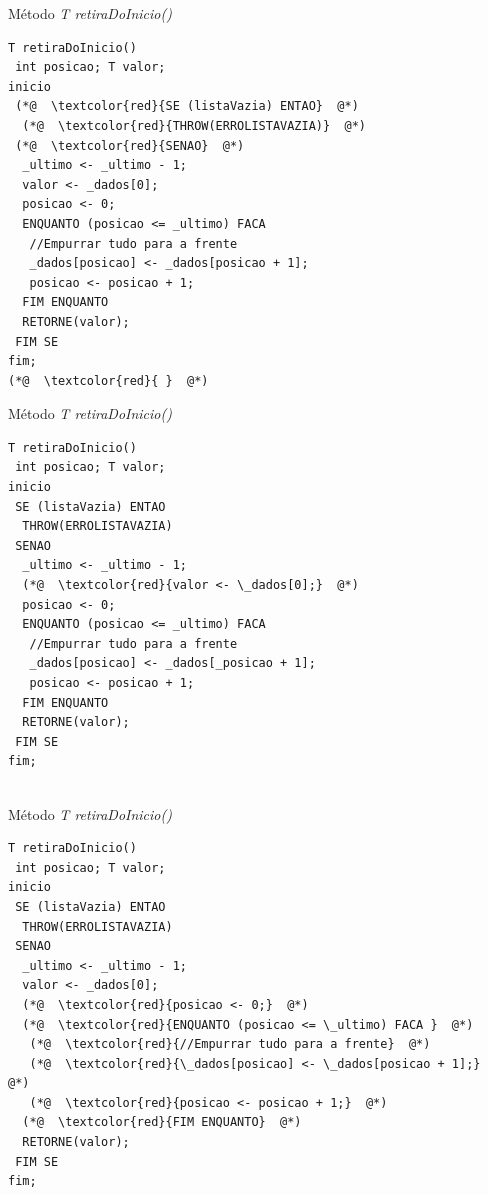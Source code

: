 \documentclass[12pt,table,xcolor={dvipsnames}]{beamer}
\begin{document}
\begin{frame}[fragile]{Método \textit{T retiraDoInicio()}}
\begin{lstlisting}
T retiraDoInicio()
 int posicao; T valor;
inicio
 (*@  \textcolor{red}{SE (listaVazia) ENTAO}  @*)
  (*@  \textcolor{red}{THROW(ERROLISTAVAZIA)}  @*)
 (*@  \textcolor{red}{SENAO}  @*)
  _ultimo <- _ultimo - 1;
  valor <- _dados[0];
  posicao <- 0;
  ENQUANTO (posicao <= _ultimo) FACA 
   //Empurrar tudo para a frente
   _dados[posicao] <- _dados[posicao + 1];
   posicao <- posicao + 1;
  FIM ENQUANTO
  RETORNE(valor);
 FIM SE
fim;
(*@  \textcolor{red}{ }  @*)
\end{lstlisting}
\end{frame}

\begin{frame}[fragile]{Método \textit{T retiraDoInicio()}}
\begin{lstlisting}
T retiraDoInicio()
 int posicao; T valor;
inicio
 SE (listaVazia) ENTAO
  THROW(ERROLISTAVAZIA)
 SENAO
  _ultimo <- _ultimo - 1;
  (*@  \textcolor{red}{valor <- \_dados[0];}  @*)
  posicao <- 0;
  ENQUANTO (posicao <= _ultimo) FACA 
   //Empurrar tudo para a frente
   _dados[posicao] <- _dados[_posicao + 1];
   posicao <- posicao + 1;
  FIM ENQUANTO
  RETORNE(valor);
 FIM SE
fim;
 
\end{lstlisting}
\end{frame}

\begin{frame}[fragile]{Método \textit{T retiraDoInicio()}}
\begin{lstlisting}
T retiraDoInicio()
 int posicao; T valor;
inicio
 SE (listaVazia) ENTAO
  THROW(ERROLISTAVAZIA)
 SENAO
  _ultimo <- _ultimo - 1;
  valor <- _dados[0];
  (*@  \textcolor{red}{posicao <- 0;}  @*)
  (*@  \textcolor{red}{ENQUANTO (posicao <= \_ultimo) FACA }  @*)
   (*@  \textcolor{red}{//Empurrar tudo para a frente}  @*)
   (*@  \textcolor{red}{\_dados[posicao] <- \_dados[posicao + 1];}  @*)
   (*@  \textcolor{red}{posicao <- posicao + 1;}  @*)
  (*@  \textcolor{red}{FIM ENQUANTO}  @*)
  RETORNE(valor);
 FIM SE
fim;
 
\end{lstlisting}
\end{frame}
\end{document}
